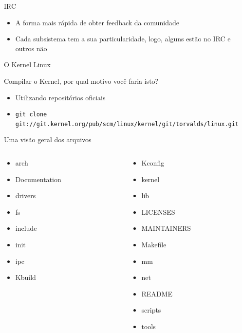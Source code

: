 \documentclass[10pt, compress, aspectratio=169]{beamer}
\begin{document}
\begin{frame}{IRC}
  \begin{itemize}
    \item A forma mais rápida de obter feedback da comunidade
    \item Cada subsistema tem a sua particularidade, logo, alguns estão no IRC
          e outros não
  \end{itemize}
\end{frame}

\begin{frame}{O Kernel Linux}

  Compilar o Kernel, por qual motivo você faria isto? \pause

  \begin{itemize}
    \item Utilizando repositórios oficiais
    \item \texttt{git clone git://git.kernel.org/pub/scm/linux/kernel/git/torvalds/linux.git}
  \end{itemize}

\end{frame}

\begin{frame}{Uma visão geral dos arquivos}

  \begin{columns}[T]
    \begin{column}{.4\textwidth}
      \begin{itemize}
        \item arch
        \item Documentation
        \item drivers
        \item fs
        \item include
        \item init
        \item ipc
        \item Kbuild
      \end{itemize}
    \end{column}

    \hfill
    \begin{column}{.5\textwidth}
      \begin{itemize}
        \item Kconfig
        \item kernel
        \item lib
        \item LICENSES
        \item MAINTAINERS
        \item Makefile
        \item mm
        \item net
        \item README
        \item scripts
        \item tools
      \end{itemize}
   \end{column}
  \end{columns}

\end{frame}
\end{document}
